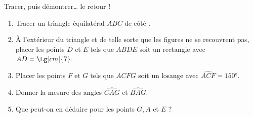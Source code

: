 \begin{exercice*} %
   Tracer, puis démontrer\dots{} le retour !
   \begin{enumerate}
      \item Tracer un triangle équilatéral $ABC$ de côté .
      \item À l'extérieur du triangle et de telle sorte que les figures ne se recouvrent pas, placer les points $D$ et $E$ tels que $ABDE$ soit un rectangle avec $AD =\Lg[cm]{7}$.
      \item Placer les points $F$ et $G$ tels que $ACFG$ soit un losange avec $\widehat{ACF} =\ang{150}$.
      \item Donner la mesure des angles $\widehat{CAG}$ et $\widehat{BAG}$.
      \item Que peut-on en déduire pour les points $G, A$ et $E$ ?
   \end{enumerate}
\end{exercice*}

